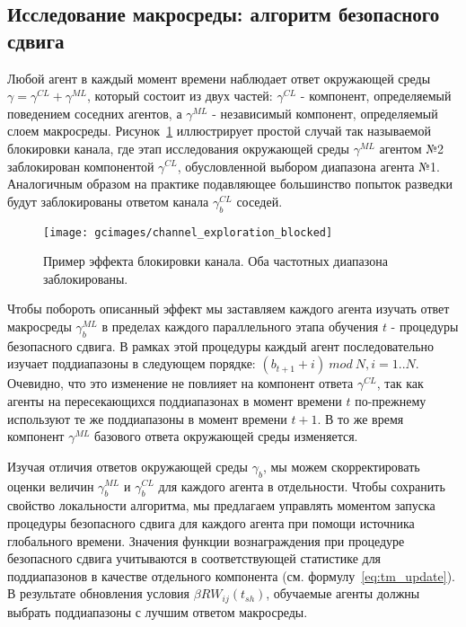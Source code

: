 \subsection{Исследование макросреды: алгоритм безопасного сдвига}
\label{sec:safe_shift}
Любой агент в каждый момент времени наблюдает ответ окружающей среды $\gamma = \gamma^{CL} + \gamma^{ML}$, который состоит из двух частей: $\gamma^{CL}$ - компонент, определяемый поведением соседних агентов, а $\gamma^{ML}$ - независимый компонент, определяемый слоем макросреды.
Рисунок~\ref{fig:channel_exploration_blocked} иллюстрирует простой случай так называемой блокировки канала, где этап исследования окружающей среды $\gamma^{ML}$ агентом №2 заблокирован компонентой $\gamma^{CL}$, обусловленной выбором диапазона агента №1. Аналогичным образом на практике подавляющее большинство попыток разведки будут заблокированы ответом канала $\gamma_b^{CL}$ соседей.

\begin{figure}
    \centering
    \texttt{[image: gcimages/channel\_exploration\_blocked]}
    \caption{Пример эффекта блокировки канала. Оба частотных диапазона заблокированы.}
    \label{fig:channel_exploration_blocked}
\end{figure}

Чтобы побороть описанный эффект мы заставляем каждого агента изучать ответ макросреды $\gamma_b^{ML}$ в пределах каждого параллельного этапа обучения $t$ - процедуры безопасного сдвига. В рамках этой процедуры каждый агент последовательно изучает поддиапазоны в следующем порядке: ${(b_{t+1}+i)~mod~N}, i=1..N$. Очевидно, что это изменение не повлияет на компонент ответа $\gamma^{CL}$, так как агенты на пересекающихся поддиапазонах в момент времени $t$ по-прежнему используют те же поддиапазоны в момент времени ${t+1}$. В то же время компонент $\gamma^{ML}$ базового ответа окружающей среды изменяется.

Изучая отличия ответов окружающей среды $\gamma_b$, мы можем скорректировать оценки величин $\gamma_b^{ML}$ и $\gamma_b^{CL}$ для каждого агента в отдельности. Чтобы сохранить свойство локальности алгоритма, мы предлагаем управлять моментом запуска процедуры безопасного сдвига для каждого агента при помощи источника глобального времени. Значения функции вознаграждения при процедуре безопасного сдвига учитываются в соответствующей статистике для поддиапазонов в качестве отдельного компонента (см. формулу~\ref{eq:tm_update}). В результате обновления условия $\beta RW_{ij}(t_{sh})$, обучаемые агенты должны выбрать поддиапазоны с лучшим ответом макросреды.

